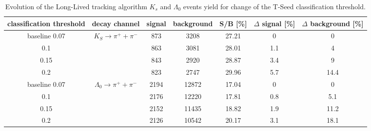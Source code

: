 \begin{table}[h]
\caption{Evolution of the Long-Lived tracking algorithm $K_s$ and $\Lambda_0$ events yield for change of the T-Seed classification threshold.}
\begin{tabular}{|c|c|c|c|c|c|c|}
\hline
classification threshold & decay channel                                              & signal & background & S/B [\%] & $\Delta$ signal [\%] & $\Delta$ background [\%] \\ \hline
baseline 0.07            & \multirow{4}{*}{$K_S \rightarrow \pi^{+} + \pi^{-}$}       & 873    & 3208       & 27.21    & 0                    & 0                        \\ \cline{1-1} \cline{3-7} 
0.1                      &                                                            & 863    & 3081       & 28.01    & 1.1                  & 4                        \\ \cline{1-1} \cline{3-7} 
0.15                     &                                                            & 843    & 2920       & 28.87    & 3.4                  & 9                        \\ \cline{1-1} \cline{3-7} 
0.2                      &                                                            & 823    & 2747       & 29.96    & 5.7                  & 14.4                     \\ \hline
baseline 0.07            & \multirow{4}{*}{$\Lambda_0 \rightarrow \pi^{+} + \pi^{-}$} & 2194   & 12872      & 17.04    & 0                    & 0                        \\ \cline{1-1} \cline{3-7} 
0.1                      &                                                            & 2176   & 12220      & 17.81    & 0.8                  & 5.1                      \\ \cline{1-1} \cline{3-7} 
0.15                     &                                                            & 2152   & 11435      & 18.82    & 1.9                  & 11.2                     \\ \cline{1-1} \cline{3-7} 
0.2                      &                                                            & 2126   & 10542      & 20.17    & 3.1                  & 18.1                     \\ \hline
\end{tabular}
\label{tab:finetuning}
\end{table}


